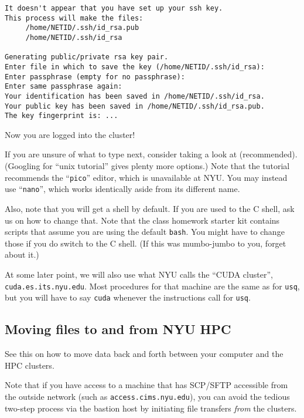 \documentclass[11pt]{article}
\begin{document}
\begin{lstlisting}
It doesn't appear that you have set up your ssh key.
This process will make the files:
     /home/NETID/.ssh/id_rsa.pub
     /home/NETID/.ssh/id_rsa

Generating public/private rsa key pair.
Enter file in which to save the key (/home/NETID/.ssh/id_rsa):
Enter passphrase (empty for no passphrase):
Enter same passphrase again:
Your identification has been saved in /home/NETID/.ssh/id_rsa.
Your public key has been saved in /home/NETID/.ssh/id_rsa.pub.
The key fingerprint is: ...
\end{lstlisting}

Now you are logged into the cluster!

If you are unsure of what to type next, consider taking a look at
 (recommended). (Googling for ``unix tutorial''
gives plenty more options.) Note that the tutorial recommends the
``\texttt{pico}'' editor, which is unavailable at NYU. You may instead
use ``\texttt{nano}'', which works identically aside from its
different name.

Also, note that you will get a
 shell
by default. If you are used to the C shell, ask us on how to change
that. Note that the class homework starter kit contains scripts that
assume you are using the default \texttt{bash}. You might have to
change those if you do switch to the C shell.  (If this was
mumbo-jumbo to you, forget about it.)

At some later point, we will also use what NYU calls the ``CUDA
cluster'', \texttt{cuda.es.its.nyu.edu}. Most procedures for that
machine are the same as for \texttt{usq}, but you will have to
say \texttt{cuda} whenever the instructions call for \texttt{usq}.

\subsection*{Moving files to and from NYU HPC}

See this
 on how to move data back and forth between your computer and the
HPC clusters.

Note that if you have access to a machine that has SCP/SFTP accessible
from the outside network (such as \texttt{access.cims.nyu.edu}), you
can avoid the tedious two-step process via the bastion host by
initiating file transfers \emph{from} the clusters.
\end{document}
